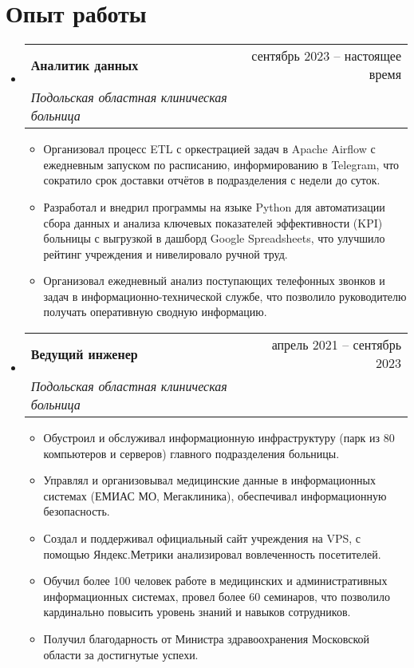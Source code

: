 \documentclass[letterpaper,11pt]{article}
\makeatletter
\newcommand{\resumeItem}[1]{
  \item\small{
    {#1 \vspace{-2pt}}
  }
}
\newcommand{\resumeSubheading}[4]{
  \vspace{-2pt}\item
    \begin{tabular*}{0.97\textwidth}[t]{l@{\extracolsep{\fill}}r}
      \textbf{#1} & #2 \\
      \textit{\small#3} & \textit{\small #4} \\
    \end{tabular*}\vspace{-7pt}
}
\newcommand{\resumeSubSubheading}[2]{
    \item
    \begin{tabular*}{0.97\textwidth}{l@{\extracolsep{\fill}}r}
      \textit{\small#1} & \textit{\small #2} \\
    \end{tabular*}\vspace{-7pt}
}
\newcommand{\resumeSubHeadingListStart}{\begin{itemize}[leftmargin=0.15in, label={}]}
\newcommand{\resumeSubHeadingListEnd}{\end{itemize}}
\newcommand{\resumeItemListStart}{\begin{itemize}}
\newcommand{\resumeItemListEnd}{\end{itemize}\vspace{-5pt}}
\makeatother
\begin{document}
\section{Опыт работы}
  \resumeSubHeadingListStart
    \resumeSubheading
      {Аналитик данных}{сентябрь 2023 -- настоящее время}
      {Подольская областная клиническая больница}{}
      \resumeItemListStart
        \resumeItem{Организовал процесс ETL с оркестрацией задач в Apache Airflow с ежедневным запуском по расписанию, информированию в Telegram, что сократило срок доставки отчётов в подразделения с недели до суток.}
        \resumeItem{Разработал и внедрил программы на языке Python для автоматизации сбора данных и анализа ключевых показателей эффективности (KPI) больницы с выгрузкой в дашборд Google Spreadsheets, что улучшило рейтинг учреждения и нивелировало ручной труд.}
        \resumeItem{Организовал ежедневный анализ поступающих телефонных звонков и задач в информационно-технической службе, что позволило руководителю получать оперативную сводную информацию.}
      \resumeItemListEnd


    \resumeSubheading
      {Ведущий инженер}{апрель 2021 -- сентябрь 2023}
      {Подольская областная клиническая больница}{}
      \resumeItemListStart
        \resumeItem{Обустроил и обслуживал информационную инфраструктуру (парк из 80 компьютеров и серверов) главного подразделения больницы.}
        \resumeItem{Управлял и организовывал медицинские данные в информационных системах (ЕМИАС МО, Мегаклиника), обеспечивал информационную безопасность.}
        \resumeItem{Создал и поддерживал официальный сайт учреждения на VPS, с помощью Яндекс.Метрики анализировал вовлеченность посетителей.}
        \resumeItem{Обучил более 100 человек работе в медицинских и административных информационных системах, провел более 60 семинаров, что позволило кардинально повысить уровень знаний и навыков сотрудников.}
        \resumeItem{Получил благодарность от Министра здравоохранения Московской области за достигнутые успехи.}
    \resumeItemListEnd

  \resumeSubHeadingListEnd
\end{document}
